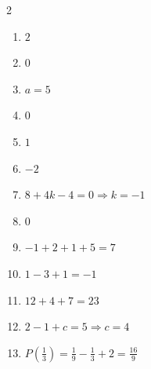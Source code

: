 \documentclass[11pt]{article}
\begin{document}
\begin{keybox}
\begin{multicols}{2}
\small
\begin{enumerate}[leftmargin=*,itemsep=3pt]
  \item $2$
  \item $0$
  \item $a=5$
  \item $0$
  \item $1$
  \item $-2$
  \item $8+4k-4=0\Rightarrow k=-1$
  \item $0$
  \item $-1+2+1+5=7$
  \item $1-3+1=-1$
  \item $12+4+7=23$
  \item $2-1+c=5\Rightarrow c=4$
  \item $P(\tfrac13)=\tfrac19-\tfrac13+2=\tfrac{16}{9}$
\end{enumerate}
\end{multicols}
\end{keybox}
\end{document}

